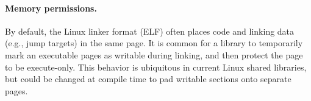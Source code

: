 







\paragraph{Memory permissions.} %
By default, the Linux linker format (ELF) often places
code and linking data (e.g., jump targets) in the same page.
It is common for a library to temporarily mark an executable pages as writable
during linking, and then protect the page to be execute-only.
This behavior is ubiquitous in current Linux shared libraries, but could be changed at compile time to pad
writable sections onto separate pages.

